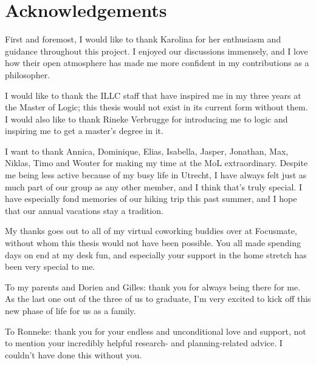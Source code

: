 \chapter*{Acknowledgements}

First and foremost, I would like to thank Karolina for her enthusiasm and guidance throughout this project. I enjoyed our discussions immensely, and I love how their open atmosphere has made me more confident in my contributions as a philosopher.

I would like to thank the ILLC staff that have inspired me in my three years at the Master of Logic; this thesis would not exist in its current form without them.
I would also like to thank Rineke Verbrugge for introducing me to logic and inspiring me to get a master's degree in it.

I want to thank Annica, Dominique, Elias, Isabella, Jasper, Jonathan, Max, Niklas, Timo and Wouter for making my time at the MoL extraordinary. Despite me being less active because of my busy life in Utrecht, I have always felt just as much part of our group as any other member, and I think that's truly special. I have especially fond memories of our hiking trip this past summer, and I hope that our annual vacations stay a tradition.

My thanks goes out to all of my virtual coworking buddies over at Focusmate, without whom this thesis would not have been possible. You all made spending days on end at my desk fun, and especially your support in the home stretch has been very special to me.

To my parents and Dorien and Gilles: thank you for always being there for me. As the last one out of the three of us to graduate, I'm very excited to kick off this new phase of life for us as a family.

To Ronneke: thank you for your endless and unconditional love and support, not to mention your incredibly helpful research- and planning-related advice. I couldn't have done this without you.

